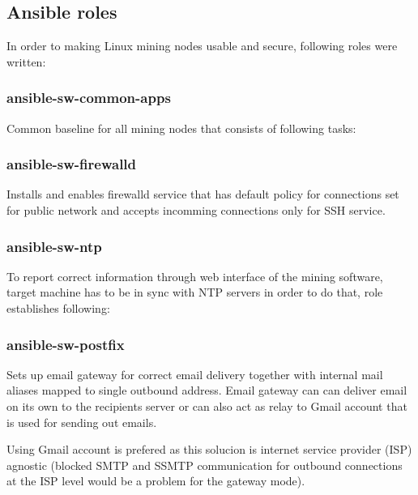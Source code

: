 \documentclass[
  printed, %
  table,   %
  nolof,     %
  nolot,     %
           oneside, color
]{fithesis3}
\renewcommand{\texttt}[1]{%
  \begingroup
  \ttfamily
  \begingroup\lccode`~=`/\lowercase{\endgroup\def~}{/\discretionary{}{}{}}%
  \begingroup\lccode`~=`[\lowercase{\endgroup\def~}{[\discretionary{}{}{}}%
  \begingroup\lccode`~=`.\lowercase{\endgroup\def~}{.\discretionary{}{}{}}%
  \catcode`/=\active\catcode`[=\active\catcode`.=\active
  \scantokens{#1\noexpand}%
  \endgroup
}
\begin{document}
\subsection{Ansible roles}
In order to making Linux mining nodes usable and secure, following roles were written:
\subsubsection{ansible-sw-common-apps}
Common baseline for all mining nodes that consists of following tasks:
\subsubsection{ansible-sw-firewalld}
Installs and enables firewalld service that has default policy for connections set for public network and accepts incomming connections only for SSH service.
\subsubsection{ansible-sw-ntp}
To report correct information through web interface of the mining software, target machine has to be in sync with NTP servers in order to do that, role establishes following:
\subsubsection{ansible-sw-postfix}
Sets up email gateway for correct email delivery together with internal mail aliases mapped to single outbound address. Email gateway can can deliver email on its own to the recipients server or can also act as relay to Gmail account that is used for sending out emails. 

Using Gmail account is prefered as this solucion is internet service provider (ISP) agnostic (blocked SMTP and SSMTP communication for outbound connections at the ISP level would be a problem for the gateway mode). 
\end{document}
